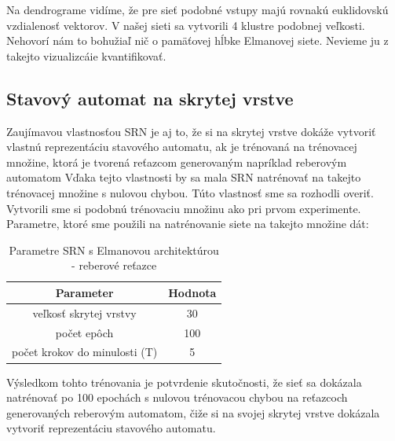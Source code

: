 Na dendrograme vidíme, že pre sieť podobné vstupy majú rovnakú euklidovskú vzdialenosť vektorov.
V našej sieti sa vytvorili 4 klustre podobnej veľkosti. Nehovorí nám to bohužiaľ nič o pamäťovej hĺbke Elmanovej siete.
Nevieme ju z takejto vizualizcáie kvantifikovať.

\subsection{Stavový automat na skrytej vrstve}
Zaujímavou vlastnosťou SRN je aj to, že si na skrytej vrstve dokáže vytvoriť vlastnú reprezentáciu stavového automatu, ak 
je trénovaná na trénovacej množine, ktorá je tvorená reťazcom generovaným napríklad reberovým automatom \cite{Servan-Schreiber1991}
Vďaka tejto vlastnosti by sa mala SRN natrénovať na takejto trénovacej množine s nulovou chybou.
Túto vlastnosť sme sa rozhodli overiť.
Vytvorili sme si podobnú trénovaciu množinu ako pri prvom experimente.
Parametre, ktoré sme použili na natrénovanie siete na takejto množine dát:
\begin{table}[h!]
    \centering
    \begin{tabular}{|c|c|} 
    \hline
    Parameter & Hodnota \\ 
    \hline
    veľkosť skrytej vrstvy & 30  \\
    \hline
    počet epôch & 100  \\
    \hline
    počet krokov do minulosti (T) & 5 \\
    \end{tabular}
    \caption{Parametre SRN s Elmanovou architektúrou - reberové reťazce}
    \label{table:1}
\end{table}
Výsledkom tohto trénovania je potvrdenie skutočnosti, že sieť sa dokázala 
natrénovať po 100 epochách s nulovou trénovacou chybou na reťazcoch generovaných reberovým automatom, 
čiže si na svojej skrytej vrstve dokázala vytvoriť reprezentáciu stavového automatu.






